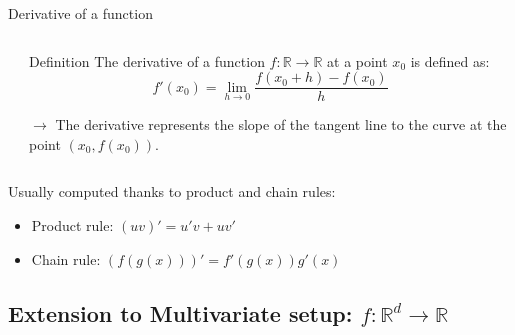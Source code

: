 \documentclass[aspectratio=1610]{beamer}
\begin{document}
\begin{frame}{Derivative of a function}

  \begin{columns}
    \begin{column}{0.45\textwidth}
    \end{column}
    \begin{column}{0.45\textwidth}
      \begin{block}{Definition}
        The derivative of a function $f:\mathbb{R}\to\mathbb{R}$ at a point $x_0$ is defined as:
        $$f'(x_0) = \lim_{h\to 0} \frac{f(x_0 + h) - f(x_0)}{h}$$
      \end{block}
      $\rightarrow$ The derivative represents the slope of the tangent line to the curve at the point $(x_0, f(x_0))$.
    \end{column}
  \end{columns}

  Usually computed thanks to product and chain rules:
  \begin{itemize}
    \item Product rule: $(uv)' = u'v + uv'$
    \item Chain rule: $(f(g(x)))' = f'(g(x))g'(x)$
  \end{itemize}
\end{frame}

\subsection{Extension to Multivariate setup: $f:\mathbb{R}^d \to \mathbb{R}$}
\end{document}
